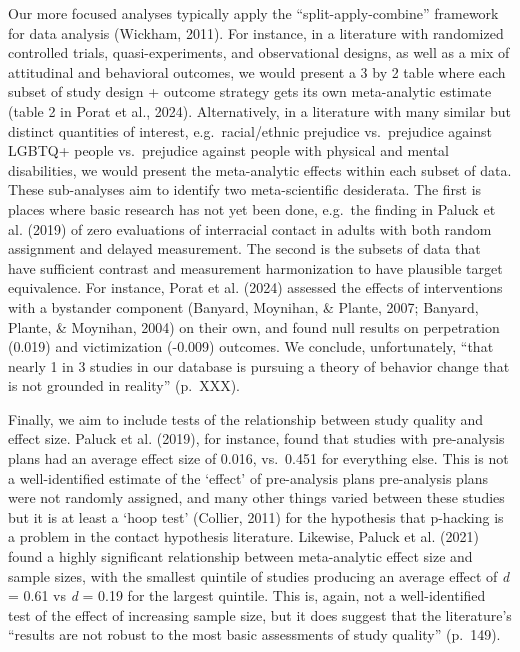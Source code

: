 \documentclass[
  ,jou]{apa6}
\begin{document}
Our more focused analyses typically apply the ``split-apply-combine'' framework for data analysis (Wickham, 2011). For instance, in a literature with randomized controlled trials, quasi-experiments, and observational designs, as well as a mix of attitudinal and behavioral outcomes, we would present a 3 by 2 table where each subset of study design + outcome strategy gets its own meta-analytic estimate (table 2 in Porat et al., 2024). Alternatively, in a literature with many similar but distinct quantities of interest, e.g.~racial/ethnic prejudice vs.~prejudice against LGBTQ+ people vs.~prejudice against people with physical and mental disabilities, we would present the meta-analytic effects within each subset of data. These sub-analyses aim to identify two meta-scientific desiderata. The first is places where basic research has not yet been done, e.g.~the finding in Paluck et al. (2019) of zero evaluations of interracial contact in adults with both random assignment and delayed measurement. The second is the subsets of data that have sufficient contrast and measurement harmonization to have plausible target equivalence. For instance, Porat et al. (2024) assessed the effects of interventions with a bystander component (Banyard, Moynihan, \& Plante, 2007; Banyard, Plante, \& Moynihan, 2004) on their own, and found null results on perpetration (0.019) and victimization (-0.009) outcomes. We conclude, unfortunately, ``that nearly 1 in 3 studies in our database is pursuing a theory of behavior change that is not grounded in reality'' (p.~XXX).

Finally, we aim to include tests of the relationship between study quality and effect size. Paluck et al. (2019), for instance, found that studies with pre-analysis plans had an average effect size of 0.016, vs.~0.451 for everything else. This is not a well-identified estimate of the `effect' of pre-analysis plans \textemdash pre-analysis plans were not randomly assigned, and many other things varied between these studies \textemdash but it is at least a `hoop test' (Collier, 2011) for the hypothesis that p-hacking is a problem in the contact hypothesis literature. Likewise, Paluck et al. (2021) found a highly significant relationship between meta-analytic effect size and sample sizes, with the smallest quintile of studies producing an average effect of \emph{d} = 0.61 vs \emph{d} = 0.19 for the largest quintile. This is, again, not a well-identified test of the effect of increasing sample size, but it does suggest that the literature's ``results are not robust to the most basic assessments of study quality'' (p.~149).
\end{document}
